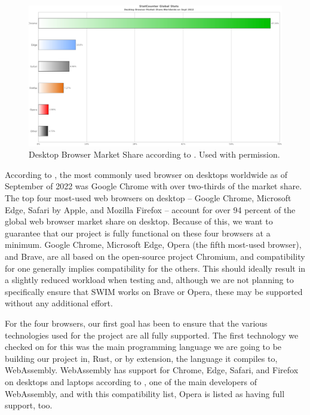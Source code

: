 \documentclass[
    paper=letter,
    parskip=half,
    fontsize=12pt,
    titlepage=firstiscover,
    toc=bibliography,
    numbers=endperiod
]{scrartcl}
\begin{document}
\begin{figure}[H]
    \includegraphics[width=\textwidth]{browser-global-stats}
    \caption{Desktop Browser Market Share according to \protect\cite{statcounter}. Used with
        permission.}
\end{figure}

According to \cite{statcounter}, the most commonly used browser on
desktops worldwide as of September of 2022 was Google Chrome with over
two-thirds of the market share. The top four most-used web browsers on
desktop -- Google Chrome, Microsoft Edge, Safari by Apple, and Mozilla
Firefox -- account for over 94 percent of the global web browser market
share on desktop. Because of this, we want to guarantee that our project
is fully functional on these four browsers at a minimum. Google Chrome,
Microsoft Edge, Opera (the fifth most-used browser), and Brave, are all
based on the open-source project Chromium, and compatibility for one
generally implies compatibility for the others. This should ideally
result in a slightly reduced workload when testing and, although we are
not planning to specifically ensure that SWIM works on Brave or Opera,
these may be supported without any additional effort.

For the four browsers, our first goal has been to ensure that the
various technologies used for the project are all fully supported. The
first technology we checked on for this was the main programming
language we are going to be building our project in, Rust, or by
extension, the language it compiles to, WebAssembly. WebAssembly has
support for Chrome, Edge, Safari, and Firefox on desktops and laptops
according to \cite{mdn-webassembly}, one of the main developers of
WebAssembly, and with this compatibility list, Opera is listed as having
full support, too.
\end{document}
